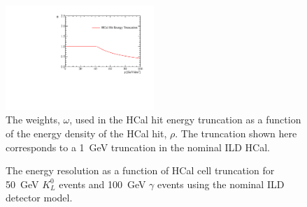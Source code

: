 \begin{figure}[h!]
\includegraphics[width=0.5\textwidth]{EnergyEstimators/Plots/SoftComp/Weights/CellTruncWeights.pdf}
\caption[The weights, $\omega$, used in the HCal hit energy truncation as a function of the energy density of the HCal hit, $\rho$.  The truncation shown here corresponds to a 1~GeV truncation in the nominal ILD HCal.]{The weights, $\omega$, used in the HCal hit energy truncation as a function of the energy density of the HCal hit, $\rho$.  The truncation shown here corresponds to a 1~GeV truncation in the nominal ILD HCal.}
\label{fig:hcalcellweight}
\end{figure}

\begin{figure}[h!]
\caption[The energy resolution as a function of HCal cell truncation for \protect{} 50~GeV $K^{0}_{L}$ events and \protect{} 100~GeV $\gamma$ events using the nominal ILD detector model.]{The energy resolution as a function of HCal cell truncation for \protect{} 50~GeV $K^{0}_{L}$ events and \protect{} 100~GeV $\gamma$ events using the nominal ILD detector model.}
\label{fig:ercelltrunc}
\end{figure}

